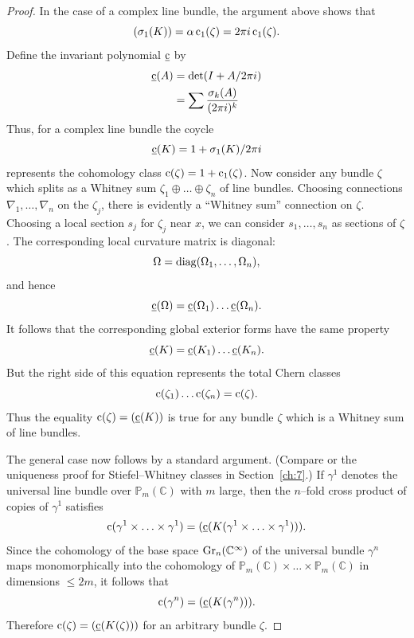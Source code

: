 \documentclass[../main]{subfiles}
\begin{document}
\begin{proof}
In the case of a complex line bundle, the argument above shows that \[(\sigma_1(K)) = \alpha \operatorname{c}_1(\zeta) = 2 \pi i \operatorname{c}_1(\zeta).\] Define the invariant polynomial $\underline {\operatorname{c}}$ by 
\begin{align*}
{\underline {\operatorname{c}}}(A) & = \det(I + A/2\pi i) \\ & = \sum \dfrac{\sigma_k(A)}{(2 \pi i)^k}
\end{align*}
Thus, for a complex line bundle the coycle \[{\underline {\operatorname{c}}}(K) = 1 + \sigma_1(K)/2 \pi i\] represents the cohomology class $\operatorname{c}(\zeta) = 1 + \operatorname{c}_1(\zeta)$. Now consider any bundle $\zeta$ which splits as a Whitney sum $\zeta_1 \oplus \ldots \oplus \zeta_n$ of line bundles. Choosing connections $\nabla_1, \ldots, \nabla_n$ on the $\zeta_j$, there is evidently a ``Whitney sum'' connection on $\zeta$. Choosing a local section $s_j$ for $\zeta_j$ near $x$, we can consider $s_1, \ldots, s_n$ as sections of $\zeta$. The corresponding local curvature matrix is diagonal: \[\Omega = \operatorname{diag}(\Omega_1, \ldots, \Omega_n),\] and hence \[{\underline {\operatorname{c}}}(\Omega) = {\underline {\operatorname{c}}}(\Omega_1) \ldots {\underline {\operatorname{c}}}(\Omega_n).\] It follows that the corresponding global exterior forms have the same property \[{\underline {\operatorname{c}}}(K) = {\underline {\operatorname{c}}}(K_1) \ldots {\underline {\operatorname{c}}}(K_n).\] But the right side of this equation represents the total Chern classes \[\operatorname{c}(\zeta_1) \ldots \operatorname{c}(\zeta_n) = \operatorname{c}(\zeta).\] Thus the equality $\operatorname{c} (\zeta) = ({\underline {\operatorname{c}}}(K))$ is true for any bundle $\zeta$ which is a Whitney sum of line bundles.

The general case now follows by a standard argument. (Compare \cite[Section 4.2]{hirzebruchalggeo1966} or the uniqueness proof for Stiefel--Whitney classes in Section~\ref{ch:7}.) If $\gamma^1$ denotes the universal line bundle over ${\mathbb P}_m(\mathbb C)$ with $m$ large, then the $n$--fold cross product of copies of $\gamma^1$ satisfies \[\operatorname{c}(\gamma^1 \times \ldots \times \gamma^1) = ({\underline {\operatorname{c}}}(K(\gamma^1 \times \ldots \times \gamma^1))).\] Since the cohomology of the base space $\operatorname{Gr}_n({\mathbb C}^\infty)$ of the universal bundle $\gamma^n$ maps monomorphically into the cohomology of ${\mathbb P}_m(\mathbb C) \times \ldots \times {\mathbb P}_m(\mathbb C)$ in dimensions $\le 2m$, it follows that \[\operatorname{c}(\gamma^n) = ({\underline {\operatorname{c}}}(K(\gamma^n))).\] Therefore $\operatorname{c}(\zeta) = ({\underline {\operatorname{c}}}(K(\zeta)))$ for an arbitrary bundle $\zeta$. 
\end{proof}
\end{document}
